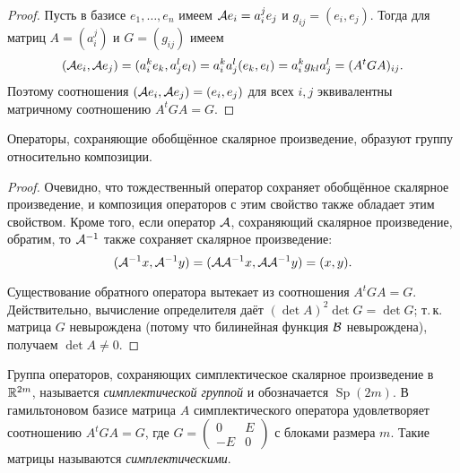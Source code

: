 \begin{proof}
    Пусть в базисе $e_1, \ldots, e_n$ имеем $\mathcal{A} e_i = a^j_ie_j$ и $g_{ij} = (e_i, e_j)$. Тогда для матриц $A = (a^j_i)$ и $G = (g_{ij})$ имеем
    \[
        (\mathcal{A} e_i, \mathcal{A} e_j) = (a^k_ie_k, a^l_je_l) = a^k_ia^l_j(e_k, e_l) = a^k_ig_{kl}a^l_j = (A^tGA)_{ij}.
    \]
    Поэтому соотношения $(\mathcal{A} e_i, \mathcal{A} e_j) = (e_i, e_j)$ для всех $i, j$ эквивалентны матричному соотношению $A^tGA = G$.
\end{proof}

\begin{proposal}
    Операторы, сохраняющие обобщённое скалярное произведение, образуют группу относительно композиции.
\end{proposal}

\begin{proof}
    Очевидно, что тождественный оператор сохраняет обобщённое скалярное произведение, и композиция операторов с этим свойство также обладает этим свойством. Кроме того, если оператор $\mathcal{A}$, сохраняющий скалярное произведение, обратим, то $\mathcal{A}^{-1}$ также сохраняет скалярное произведение:
    \[
        (\mathcal{A}^{-1}x, \mathcal{A}^{-1}y) = (\mathcal{A}\mathcal{A}^{-1}x, \mathcal{A}\mathcal{A}^{-1}y) = (x, y).
    \]

    Существование обратного оператора вытекает из соотношения $A^tGA = G$. Действительно, вычисление определителя даёт $(\det A)^2\det G = \det G$; т.\,к. матрица $G$ невырождена (потому что билинейная функция $\mathcal{B}$ невырождена), получаем $\det A \ne 0$.
\end{proof}

\begin{definition}
    Группа операторов, сохраняющих симплектическое скалярное произведение в $\mathbb{R}^{2m}$, называется \textit{симплектической группой} и обозначается $\operatorname{Sp}(2m)$. В гамильтоновом базисе матрица $A$ симплектического оператора удовлетворяет соотношению $A^tGA = G$, где
    $
    G =
    \begin{pmatrix}
        0 & E\\
        -E & 0
    \end{pmatrix}
    $ с блоками размера $m$. Такие матрицы называются \textit{симплектическими}.
\end{definition}

